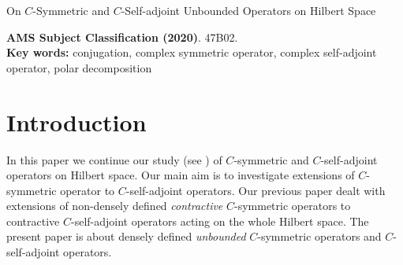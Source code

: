 \documentclass[12pt]{amsart}
\author{Yury Arlinskii}
\author{Konrad Schm\"udgen}
\theoremstyle{definition}
\newcommand{\cH}{\mathcal{H}\,}
\begin{document}
\begin{title}
{On $C$-Symmetric and $C$-Self-adjoint Unbounded Operators on Hilbert Space}
\end{title}

\address{Volodymyr Dahl East Ukrainian National University, Kyiv, Ukraine} 
\address{University of Leipzig, Mathematical Institute, Augustusplatz 10/11, D-04109 Leipzig, Germany}



\maketitle


\begin{abstract}
Let $C$ be a conjugation on a Hilbert  space $\cH$. A densely defined linear operator $A$ on $\cH$ is called $C$-symmetric if $CAC\subseteq A^*$ and $C$-self-adjoint if $CAC=A^*$. Our main results describe all $C$-self-adjoint extensions of $A$ on $\cH$. Further, we prove a $C$-self-adjointness criterion based on quasi-analytic vectors and we characterize $C$-self-adjoint operators in terms of their polar decompositions.
\end{abstract}

\bigskip

\textbf{AMS  Subject  Classification (2020)}.
 47B02.\\

\textbf{Key  words:} conjugation, complex symmetric operator, complex self-adjoint operator, polar decomposition

\bigskip

\section {Introduction}


In this paper we continue our study (see \cite{arlinskii}) of $C$-symmetric and $C$-self-adjoint operators on Hilbert space. Our main aim is to investigate extensions of $C$-symmetric operator to $C$-self-adjoint operators. Our previous paper \cite{arlinskii} dealt with extensions of non-densely defined {\it contractive} $C$-symmetric operators to contractive $C$-self-adjoint  operators acting on the whole Hilbert space. The present paper is about densely defined {\it unbounded} $C$-symmetric operators and $C$-self-adjoint operators.
\end{document}
